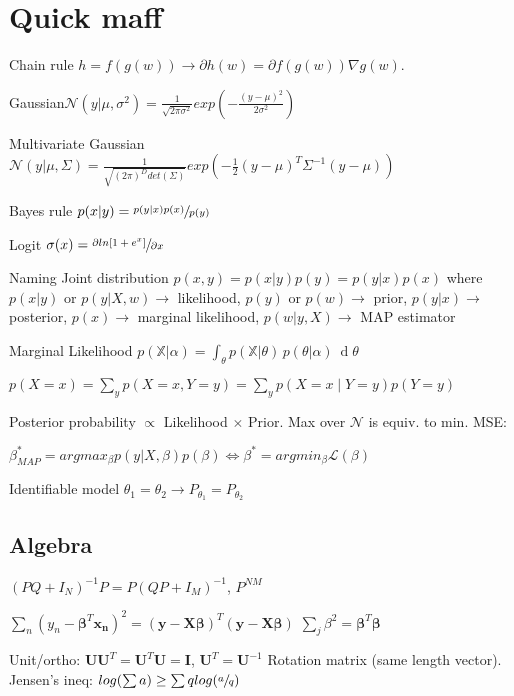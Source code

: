 \section{Quick maff}
Chain rule $h = f(g(w)) \rightarrow \partial h(w) = \partial f(g(w)) \nabla g(w)$.

Gaussian\newline $\mathcal{N}(y|\mu, \sigma^2) = \frac{1}{\sqrt{2\pi \sigma^2}} exp(-\frac{(y-\mu)^2}{2\sigma^2})$

Multivariate Gaussian $\mathcal{N}(y|\mu, \Sigma) = \frac{1}{\sqrt{(2\pi)^D det(\Sigma)}} exp(-\frac{1}{2} (y-\mu)^T \Sigma^{-1} (y-\mu))$

Bayes rule $p(x|y) = \sfrac{p(y|x) p(x)}{p(y)}$

Logit $\sigma(x) = \sfrac{\partial ln[1+e^x]}{\partial x}$

Naming
Joint distribution $p(x,y) = p(x|y)p(y) = p(y|x)p(x)$ where
$p(x|y) \text{ or } p(y|X,w) \rightarrow$ likelihood,
$p(y)  \text{ or } p(w) \rightarrow$ prior,
$p(y|x) \rightarrow$ posterior,
$p(x) \rightarrow$ marginal likelihood,
$p(w|y,X) \rightarrow$ MAP estimator 

Marginal Likelihood \newline $p({\mathbb  {X}}|\alpha )=\int _{\theta }p({\mathbb  {X}}|\theta )\,p(\theta |\alpha )\ \operatorname {d}\!\theta $

$p(X=x)=\sum_{y} p(X=x,Y=y) = \sum_{y} p(X=x \mid Y=y) p(Y=y)$

Posterior probability $\propto$ Likelihood $\times$ Prior. Max over $\mathcal{N}$ is equiv. to min. MSE: 

$\beta_{MAP}^* = arg max_{\beta} p(y|X,\beta)p(\beta) \Leftrightarrow \beta^* = arg min_{\beta} \mathcal{L}(\beta)$

Identifiable model \newline
$\theta_1 = \theta_2 \rightarrow P_{\theta_1} = P_{\theta_2}$

\subsection{Algebra}
$(PQ + I_N)^{-1} P = P (QP + I_M)^{-1}$, $P^{NM}$

$\sum_n (y_{n} -\mathbf{\beta}^T\mathbf{x_n})^2 = (\mathbf{y} - \mathbf{X}\mathbf{\beta})^T(\mathbf{y} - \mathbf{X}\mathbf{\beta})$
\newline
$\sum_j \beta^2 = \mathbf{\beta}^T \mathbf{\beta}$

Unit/ortho: $\mathbf{U}\mathbf{U}^T=\mathbf{U}^T\mathbf{U} = \mathbf{I}$, \newline $\mathbf{U}^T = \mathbf{U}^{-1}$ Rotation matrix (same length vector).
Jensen's ineq: $log(\sum a) \ge \sum q log(\sfrac{a}{q})$